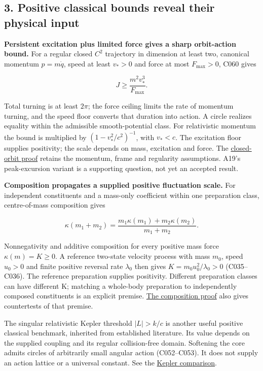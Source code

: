\documentclass[11pt,a4paper]{article}
\begin{document}
\hypertarget{positive-classical-bounds-reveal-their-physical-input}{%
\subsection{3. Positive classical bounds reveal their physical
input}\label{positive-classical-bounds-reveal-their-physical-input}}

\textbf{Persistent excitation plus limited force gives a sharp
orbit-action bound.} For a regular closed \(C^2\) trajectory in
dimension at least two, canonical momentum \(p=m\dot q\), speed at least
\(v_*>0\) and force at most \(F_{\max}>0\), C060 gives

\[J\ge\frac{m^2v_*^3}{F_{\max}}.\]

Total turning is at least \(2\pi\); the force ceiling limits the rate of
momentum turning, and the speed floor converts that duration into
action. A circle realizes equality within the admissible
smooth-potential class. For relativistic momentum the bound is
multiplied by \((1-v_*^2/c^2)^{-1}\), with \(v_*<c\). The excitation
floor supplies positivity; the scale depends on mass, excitation and
force. The \href{closed-orbit-force-action.md}{closed-orbit proof}
retains the momentum, frame and regularity assumptions. A19's
peak-excursion variant is a supporting question, not yet an accepted
result.

\textbf{Composition propagates a supplied positive fluctuation scale.}
For independent constituents and a mass-only coefficient within one
preparation class, centre-of-mass composition gives

\[\kappa(m_1+m_2)=\frac{m_1\kappa(m_1)+m_2\kappa(m_2)}{m_1+m_2}.\]

Nonnegativity and additive composition for every positive mass force
\(\kappa(m)=K\ge0\). A reference two-state velocity process with mass
\(m_0\), speed \(u_0>0\) and finite positive reversal rate \(\lambda_0\)
then gives \(K=m_0u_0^2/\lambda_0>0\) (C035--C036). The reference
preparation supplies positivity. Different preparation classes can have
different K; matching a whole-body preparation to independently composed
constituents is an explicit premise.
\href{composition-universality.md}{The composition proof} also gives
countertests of that premise.

The singular relativistic Kepler threshold \(|L|>k/c\) is another useful
positive classical benchmark, inherited from established literature. Its
value depends on the supplied coupling and its regular collision-free
domain. Softening the core admits circles of arbitrarily small angular
action (C052--C053). It does not supply an action lattice or a universal
constant. See the \href{relativistic-kepler-threshold.md}{Kepler
comparison}.
\end{document}
